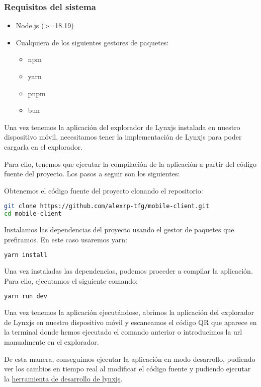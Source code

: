 \subsubsection{Requisitos del sistema}
\begin{itemize}
    \item Node.js (>=18.19)
    \item Cualquiera de los siguientes gestores de paquetes:
        \begin{itemize}
            \item npm
            \item yarn
            \item pnpm
            \item bun
        \end{itemize}
\end{itemize}
Una vez tenemos la aplicación del explorador de Lynxjs instalada en nuestro dispositivo móvil, necesitamos tener la implementación de Lynxjs para poder cargarla en el explorador.

Para ello, tenemos que ejecutar la compilación de la aplicación a partir del código fuente del proyecto. Los pasos a seguir son los siguientes:

Obtenemos el código fuente del proyecto clonando el repositorio:
\begin{lstlisting}[language=bash]
git clone https://github.com/alexrp-tfg/mobile-client.git
cd mobile-client
\end{lstlisting}

Instalamos las dependencias del proyecto usando el gestor de paquetes que prefiramos. En este caso usaremos yarn:
\begin{lstlisting}[language=bash]
yarn install
\end{lstlisting}

Una vez instaladas las dependencias, podemos proceder a compilar la aplicación. Para ello, ejecutamos el siguiente comando:
\begin{lstlisting}[language=bash]
yarn run dev
\end{lstlisting}

Una vez tenemos la aplicación ejecutándose, abrimos la aplicación del explorador de Lynxjs en nuestro dispositivo móvil y escaneamos el código QR que aparece en la terminal donde hemos ejecutado el comando anterior o introducimos la url manualmente en el explorador.

De esta manera, conseguimos ejecutar la aplicación en modo desarrollo, pudiendo ver los cambios en tiempo real al modificar el código fuente y pudiendo ejecutar la \href{github.com/lynx-family/lynx-devtool}{herramienta de desarrollo de lynxjs}.
